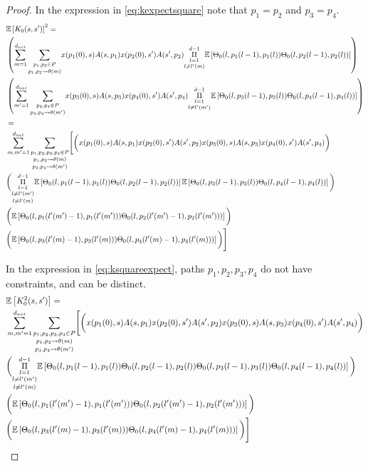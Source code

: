 \begin{proof}
In the expression in \eqref{eq:kexpectsquare} note that $p_1=p_2$ and $p_3=p_4$.
\begin{align}\label{eq:kexpectsquare}
&\mathbb{E}\left[K_0(s,s')\right]^2=\nonumber\\
&\left(\sum_{m=1}^{d_{net}}\underset{p_1,p_2\rightsquigarrow\theta(m)}{\sum_{p_1,p_2\in P}}x(p_1(0),s)A(s,p_1)x(p_2(0),s')A(s',p_2) \underset{l\neq l'(m)}{\underset{l=1}{\overset{d-1}{\Pi}}} \mathbb{E}\left[{\Theta}_0(l,p_1(l-1),p_1(l)) {\Theta}_0(l,p_2(l-1),p_2(l))\right]\right)\nonumber\\
&\left(\sum_{m'=1}^{d_{net}}\underset{p_3,p_4\rightsquigarrow\theta(m')}{\sum_{p_3,p_4\in P}}x(p_3(0),s)A(s,p_3)x(p_4(0),s')A(s',p_4) \underset{l\neq l'(m')}{\underset{l=1}{\overset{d-1}{\Pi}}} \mathbb{E}\left[{\Theta}_0(l,p_3(l-1),p_3(l)) {\Theta}_0(l,p_4(l-1),p_4(l))\right]\right)\nonumber\\
&=\nonumber\\
&\sum_{m,m'=1}^{d_{net}}\underset{p_3,p_4\rightsquigarrow\theta(m')}{\underset{p_1,p_2\rightsquigarrow\theta(m)}{\sum_{p_1,p_2,p_3,p_4\in P}}}\Bigg[\bigg(x(p_1(0),s)A(s,p_1)x(p_2(0),s')A(s',p_2)x(p_3(0),s)A(s,p_3)x(p_4(0),s')A(s',p_4)\bigg)\nonumber\\
&\bigg( \underset{l\neq l'(m)} {\underset{l\neq l'(m')}{\underset{l=1}{\overset{d-1}{\Pi}}}} \mathbb{E}\left[{\Theta}_0(l,p_1(l-1),p_1(l)) {\Theta}_0(l,p_2(l-1),p_2(l))\right]\mathbb{E}\left[{\Theta}_0(l,p_3(l-1),p_3(l)) {\Theta}_0(l,p_4(l-1),p_4(l))\right] \bigg)\nonumber\\
&\bigg( \mathbb{E}\left[{\Theta}_0(l,p_1(l'(m')-1),p_1(l'(m'))) {\Theta}_0(l,p_2(l'(m')-1),p_2(l'(m')))\right]\bigg)\nonumber\\
&\bigg(\mathbb{E}\left[{\Theta}_0(l,p_3(l'(m)-1),p_3(l'(m))) {\Theta}_0(l,p_4(l'(m)-1),p_4(l'(m)))\right] \bigg)\Bigg]\nonumber\\
\end{align}

In the expression in \eqref{eq:ksquareexpect}, paths $p_1,p_2,p_3,p_4$ do not have constraints, and can be distinct.
\begin{align}\label{eq:ksquareexpect}
&\mathbb{E}\left[K^2_0(s,s')\right]=\nonumber\\
&\sum_{m,m'=1}^{d_{net}}\underset{p_3,p_4\rightsquigarrow\theta(m')}{\underset{p_1,p_2\rightsquigarrow\theta(m)}{\sum_{p_1,p_2,p_3,p_4\in P}}}\Bigg[\bigg(x(p_1(0),s)A(s,p_1)x(p_2(0),s')A(s',p_2)x(p_3(0),s)A(s,p_3)x(p_4(0),s')A(s',p_4)\bigg)\nonumber\\
&\bigg( \underset{l\neq l'(m)} {\underset{l\neq l'(m')}{\underset{l=1}{\overset{d-1}{\Pi}}}} \mathbb{E}\left[{\Theta}_0(l,p_1(l-1),p_1(l)) {\Theta}_0(l,p_2(l-1),p_2(l)){\Theta}_0(l,p_3(l-1),p_3(l)) {\Theta}_0(l,p_4(l-1),p_4(l))\right] \bigg)\nonumber\\
&\bigg( \mathbb{E}\left[{\Theta}_0(l,p_1(l'(m')-1),p_1(l'(m'))) {\Theta}_0(l,p_2(l'(m')-1),p_2(l'(m')))\right]\bigg)\nonumber\\
&\bigg(\mathbb{E}\left[{\Theta}_0(l,p_3(l'(m)-1),p_3(l'(m))) {\Theta}_0(l,p_4(l'(m)-1),p_4(l'(m)))\right] \bigg)\Bigg]\nonumber\\
\end{align}


\end{proof}
